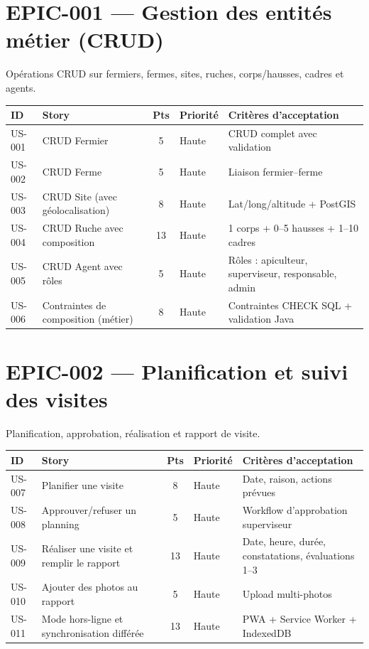 \section{EPIC-001 --- Gestion des entités métier (CRUD)}

Opérations CRUD sur fermiers, fermes, sites, ruches, corps/hausses, cadres
et agents.

\begin{center}
\begin{tabular}{lp{6.6cm}cl p{4.6cm}}
\toprule
\textbf{ID} & \textbf{Story} & \textbf{Pts} & \textbf{Priorité} & \textbf{Critères d'acceptation} \\
\midrule
US-001 & CRUD Fermier                          & 5  & Haute & CRUD complet avec validation \\
US-002 & CRUD Ferme                            & 5  & Haute & Liaison fermier--ferme \\
US-003 & CRUD Site (avec géolocalisation)      & 8  & Haute & Lat/long/altitude + PostGIS \\
US-004 & CRUD Ruche avec composition           & 13 & Haute & 1 corps + 0--5 hausses + 1--10 cadres \\
US-005 & CRUD Agent avec rôles                 & 5  & Haute & Rôles : apiculteur, superviseur, responsable, admin \\
US-006 & Contraintes de composition (métier)   & 8  & Haute & Contraintes CHECK SQL + validation Java \\
\bottomrule
\end{tabular}
\end{center}

\section{EPIC-002 --- Planification et suivi des visites}

Planification, approbation, réalisation et rapport de visite.

\begin{center}
\begin{tabular}{lp{6.6cm}cl p{4.6cm}}
\toprule
\textbf{ID} & \textbf{Story} & \textbf{Pts} & \textbf{Priorité} & \textbf{Critères d'acceptation} \\
\midrule
US-007 & Planifier une visite                    & 8  & Haute & Date, raison, actions prévues \\
US-008 & Approuver/refuser un planning           & 5  & Haute & Workflow d'approbation superviseur \\
US-009 & Réaliser une visite et remplir le rapport & 13 & Haute & Date, heure, durée, constatations, évaluations 1--3 \\
US-010 & Ajouter des photos au rapport           & 5  & Haute & Upload multi-photos \\
US-011 & Mode hors-ligne et synchronisation différée & 13 & Haute & PWA + Service Worker + IndexedDB \\
\bottomrule
\end{tabular}
\end{center}

